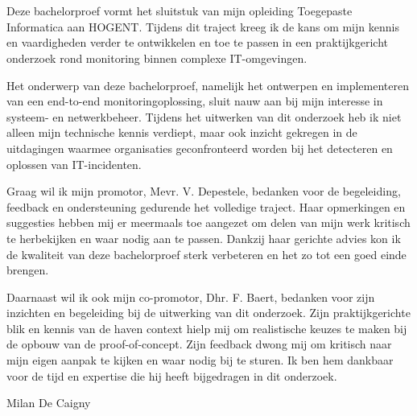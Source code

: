 
\chapter*{}%
\label{ch:voorwoord}


Deze bachelorproef vormt het sluitstuk van mijn opleiding Toegepaste Informatica aan HOGENT. Tijdens dit traject kreeg ik de kans om mijn kennis en vaardigheden verder te ontwikkelen en toe te passen in een praktijkgericht onderzoek rond monitoring binnen complexe IT-omgevingen.

Het onderwerp van deze bachelorproef, namelijk het ontwerpen en implementeren van een end-to-end monitoringoplossing, sluit nauw aan bij mijn interesse in systeem- en netwerkbeheer. Tijdens het uitwerken van dit onderzoek heb ik niet alleen mijn technische kennis verdiept, maar ook inzicht gekregen in de uitdagingen waarmee organisaties geconfronteerd worden bij het detecteren en oplossen van IT-incidenten.

Graag wil ik mijn promotor, Mevr. V. Depestele, bedanken voor de begeleiding, feedback en ondersteuning gedurende het volledige traject. Haar opmerkingen en suggesties hebben mij er meermaals toe aangezet om delen van mijn werk kritisch te herbekijken en waar nodig aan te passen. Dankzij haar gerichte advies kon ik de kwaliteit van deze bachelorproef sterk verbeteren en het zo tot een goed einde brengen.

Daarnaast wil ik ook mijn co-promotor, Dhr. F. Baert, bedanken voor zijn inzichten en begeleiding bij de uitwerking van dit onderzoek. Zijn praktijkgerichte blik en kennis van de haven context hielp mij om realistische keuzes te maken bij de opbouw van de proof-of-concept. Zijn feedback dwong mij om kritisch naar mijn eigen aanpak te kijken en waar nodig bij te sturen. Ik ben hem dankbaar voor de tijd en expertise die hij heeft bijgedragen in dit onderzoek.


\vspace{1cm}

Milan De Caigny  
